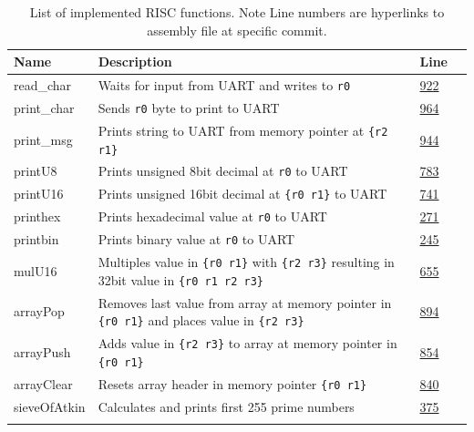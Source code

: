 \documentclass[a4paper,11pt]{article}
\begin{document}
\begin{table}[h!]
	\centering
	\newcommand{\riscLink}[1]{
		\href{https://gogs.infcof.com/min/ucl_project_y3/src/07c8da54825f4dd4f539140682916a539947067d/memory/risc8.asm\#L#1}{#1}
	}
	\begin{tabular}{| l | p{13cm} | l | l | } \hline 
		\rowcolor[rgb]{0.82,0.82,0.82}
		Name & Description & Line \\\hline
		\arrayrulecolor[rgb]{0.82,0.82,0.82}
		read\_char & Waits for input from UART and writes to \texttt{r0} &
		 \riscLink{922} \\\hline
		print\_char & Sends \texttt{r0} byte to print to UART &
		 \riscLink{964} \\\hline
		print\_msg  & Prints string to UART from memory pointer at \texttt{\{r2 r1\}} &
		 \riscLink{944} \\\hline
		printU8 & Prints unsigned 8bit decimal at \texttt{r0} to UART &
		 \riscLink{783} \\\hline
		printU16 & Prints unsigned 16bit decimal at \texttt{\{r0 r1\}} to UART &
		 \riscLink{741} \\\hline
		printhex & Prints hexadecimal value at \texttt{r0} to UART &
		 \riscLink{271} \\\hline
		printbin & Prints binary value at \texttt{r0} to UART &
		 \riscLink{245} \\\hline
		mulU16 & Multiples value in \texttt{\{r0 r1\}} with \texttt{\{r2 r3\}} resulting in 32bit value in \texttt{\{r0 r1 r2 r3\}}  &
		 \riscLink{655} \\\hline
		arrayPop & Removes last value from array at memory pointer in \texttt{\{r0 r1\}} and places value in \texttt{\{r2 r3\}} &
		 \riscLink{894} \\\hline
		arrayPush & Adds value in \texttt{\{r2 r3\}} to array at memory pointer in \texttt{\{r0 r1\}} &
		 \riscLink{854} \\\hline
		arrayClear & Resets array header in memory pointer \texttt{\{r0 r1\}} &
		 \riscLink{840} \\\hline
		sieveOfAtkin & Calculates and prints first 255 prime numbers &
		 \riscLink{375} \\\hline

		\arrayrulecolor{black}\hline
		
	\end{tabular}
	\caption{List of implemented RISC functions. Note Line numbers are hyperlinks to assembly file at specific commit.}
	\label{table:com_instr}
\end{table}
\end{document}
